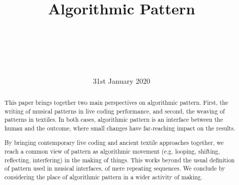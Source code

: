 \documentclass{nime-alternate} %
\begin{document}
\title{Algorithmic Pattern}

%
\author{
\alignauthor
{}\\
       \\
       \\
       \\
}

\date{31st January 2020}

\maketitle
\begin{abstract}
This paper brings together two main perspectives on algorithmic
pattern. First, the writing of musical patterns in live coding
performance, and second, the weaving of patterns in textiles. In both
cases, algorithmic pattern is an interface between the human and the
outcome, where small changes have far-reaching impact on the results.

By bringing contemporary live coding and ancient textile approaches
together, we reach a common view of pattern as algorithmic movement
(e.g. looping, shifting, reflecting, interfering) in the making of
things. This works beyond the usual definition of pattern used in
musical interfaces, of mere repeating sequences. We conclude by
considering the place of algorithmic pattern in a wider activity of
making.

\end{abstract}


\end{document}
